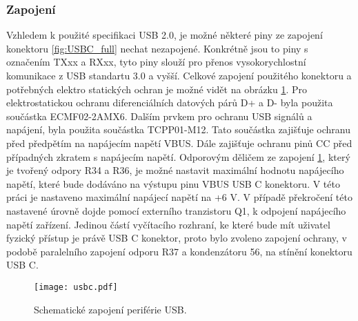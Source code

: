 	\subsubsection{Zapojení}
	Vzhledem k použité specifikaci USB 2.0, je možné některé piny ze zapojení konektoru \ref{fig:USBC_full} nechat nezapojené. Konkrétně jsou to piny s označením TXxx a RXxx, tyto piny slouží pro přenos vysokorychlostní komunikace z USB standartu 3.0 a vyšší. Celkové zapojení použitého konektoru a potřebných elektro statických ochran je možné vidět na obrázku \ref{fig:USBC_zapojeni}. Pro elektrostatickou ochranu diferenciálních datových párů D+ a D- byla použita součástka ECMF02-2AMX6. Dalším prvkem pro ochranu USB signálů a napájení, byla použita součástka TCPP01-M12. Tato součástka zajišťuje ochranu před předpětím na napájecím napětí VBUS. Dále zajišťuje ochranu pinů CC před případných zkratem s napájecím napětí. Odporovým děličem ze zapojení \ref{fig:USBC_zapojeni}, který je tvořený odpory R34 a R36, je možné nastavit maximální hodnotu napájecího napětí, které bude dodáváno na výstupu pinu VBUS USB C konektoru. V této práci je nastaveno maximální napájecí napětí na +6 V. V případě překročení této nastavené úrovně dojde pomocí externího tranzistoru Q1, k odpojení napájecího napětí zařízení. Jedinou částí vyčítacího rozhraní, ke které bude mít uživatel fyzický přístup je právě USB C konektor, proto bylo zvoleno zapojení ochrany, v podobě paralelního zapojení odporu R37 a kondenzátoru 56, na stínění konektoru USB C. 
	\begin{figure}[h!]
		\centering
		\captionsetup{justification=centering}
		\texttt{[image: usbc.pdf]}
		\caption{Schematické zapojení periférie USB.} 
		\label{fig:USBC_zapojeni}
	\end{figure} 
	
